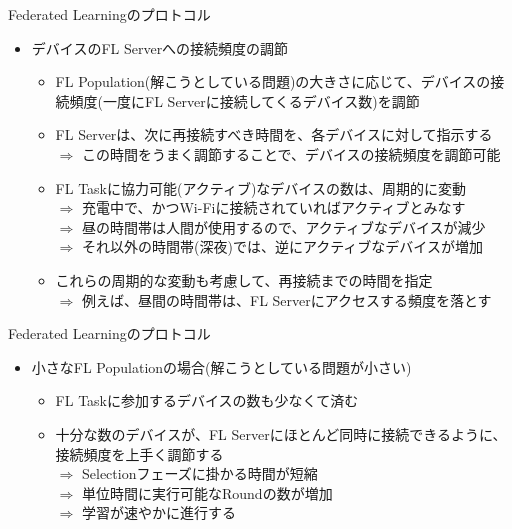 \documentclass[dvipdfmx,notheorems,t]{beamer}
\begin{document}
\begin{frame}{Federated Learningのプロトコル}

\begin{itemize}
	\item デバイスのFL Serverへの接続頻度の調節
	\begin{itemize}
		\item FL Population(解こうとしている問題)の大きさに応じて、デバイスの接続頻度(一度にFL Serverに接続してくるデバイス数)を調節
		\newline
		
		\item FL Serverは、次に再接続すべき時間を、各デバイスに対して指示する \\
		$\Rightarrow$ この時間をうまく調節することで、デバイスの接続頻度を調節可能
		\newline
		
		\item FL Taskに協力可能(\alert{アクティブ})なデバイスの数は、周期的に変動 \\
		$\Rightarrow$ 充電中で、かつWi-Fiに接続されていればアクティブとみなす \\
		$\Rightarrow$ 昼の時間帯は人間が使用するので、アクティブなデバイスが減少 \\
		$\Rightarrow$ それ以外の時間帯(深夜)では、逆にアクティブなデバイスが増加
		\newline
		
		\item これらの周期的な変動も考慮して、再接続までの時間を指定 \\
		$\Rightarrow$ 例えば、昼間の時間帯は、FL Serverにアクセスする頻度を落とす
	\end{itemize}
\end{itemize}

\end{frame}

\begin{frame}{Federated Learningのプロトコル}

\begin{itemize}	
	\item 小さなFL Populationの場合(解こうとしている問題が小さい)
	\begin{itemize}
		\item FL Taskに参加するデバイスの数も少なくて済む
		\newline
		
		\item 十分な数のデバイスが、FL Serverにほとんど同時に接続できるように、接続頻度を上手く調節する \\
		$\Rightarrow$ Selectionフェーズに掛かる時間が短縮 \\
		$\Rightarrow$ 単位時間に実行可能なRoundの数が増加 \\
		$\Rightarrow$ 学習が速やかに進行する
	\end{itemize}
\end{itemize}

\end{frame}
\end{document}
